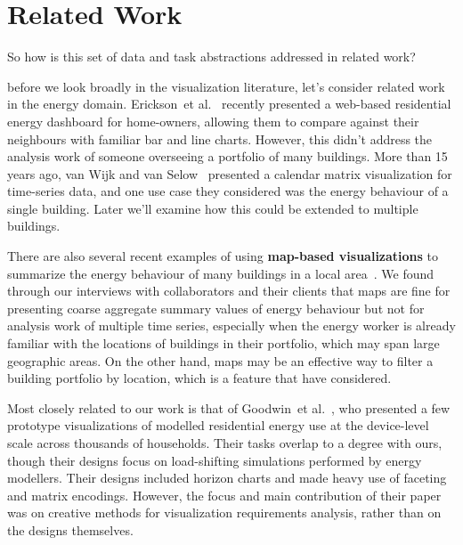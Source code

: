 \documentclass[journal]{vgtc}                %
\newcommand{\bstart}[1]{\vspace{1mm} \noindent{\textbf{#1:}}}
\newcommand{\etal}{et al.}
\begin{document}

\section{Related Work}
\label{related-work}


So how is this set of data and task abstractions addressed in related work?

\bstart{Energy visualization} before we look broadly in the visualization literature, let's consider related work in the energy domain.
Erickson~\etal~\cite{Erickson2013} recently presented a web-based residential energy dashboard for home-owners, allowing them to compare against their neighbours with familiar bar and line charts. 
However, this didn't address the analysis work of someone overseeing a portfolio of many buildings.
More than 15 years ago, van Wijk and van Selow~\cite{vanWijk1999} presented a calendar matrix visualization for time-series data, and one use case they considered was the energy behaviour of a single building.
Later we'll examine how this could be extended to multiple buildings.

There are also several recent examples of using {\bf map-based visualizations} to summarize the energy behaviour of many buildings in a local area~\cite{Heat2014,MEP2014}.
We found through our interviews with collaborators and their clients that maps are fine for presenting coarse aggregate summary values of energy behaviour but not for analysis work of multiple time series, especially when the energy worker is already familiar with the locations of buildings in their portfolio, which may span large geographic areas. 
On the other hand, maps may be an effective way to filter a building portfolio by location, which is a feature that have considered.

Most closely related to our work is that of Goodwin~\etal~\cite{Goodwin2013}, who presented a few prototype visualizations of modelled residential energy use at the device-level scale across thousands of households. 
Their tasks overlap to a degree with ours, though their designs focus on load-shifting simulations performed by energy modellers. 
Their designs included horizon charts and made heavy use of faceting and matrix encodings. 
However, the focus and main contribution of their paper was on creative methods for visualization requirements analysis, rather than on the designs themselves.
\end{document}

